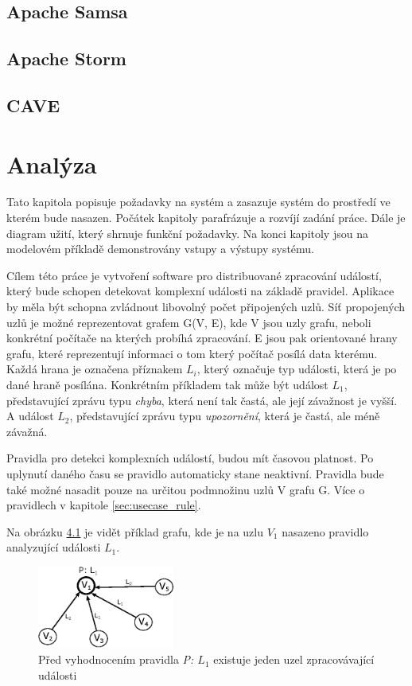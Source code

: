 \documentclass[
  digital, %
  table,   %
  nolof,     %
  nolot,     %
  oneside, %
  nocover,
  monochrome,
  12pt
]{fithesis3}
\begin{document}
\section{Apache Samsa}
\section{Apache Storm}
\section{CAVE}
\chapter{Analýza}
\label{sec:analysis}

Tato kapitola popisuje požadavky na systém a zasazuje systém do prostředí ve kterém bude nasazen. Počátek kapitoly parafrázuje a rozvíjí zadání práce. Dále je diagram užití, který shrnuje funkční požadavky. Na konci kapitoly jsou na modelovém příkladě demonstrovány vstupy a výstupy systému.

Cílem této práce je vytvoření software pro distribuované zpracování událostí, který bude schopen detekovat komplexní události na základě pravidel. Aplikace by měla být schopna zvládnout libovolný počet připojených uzlů. Síť propojených uzlů je možné reprezentovat grafem G(V, E), kde V jsou uzly grafu, neboli konkrétní počítače na kterých probíhá zpracování. E jsou pak orientované hrany grafu, které reprezentují informaci o tom který počítač posílá data kterému. Každá hrana je označena příznakem \textit{$L_i$}, který označuje typ události, která je po dané hraně posílána. Konkrétním příkladem tak může být událost \textit{$L_1$}, představující zprávu typu \textit{chyba}, která není tak častá, ale její závažnost je vyšší. A událost \textit{$L_2$}, představující zprávu typu \textit{upozornění}, která je častá, ale méně závažná.

Pravidla pro detekci komplexních událostí, budou mít časovou platnost. Po uplynutí daného času se pravidlo automaticky stane neaktivní. Pravidla bude také možné nasadit pouze na určitou podmnožinu uzlů V grafu G. Více o pravidlech v kapitole \ref{sec:usecase_rule}.

Na obrázku \ref{fig:analysis_case_1} je vidět příklad grafu, kde je na uzlu \textit{$V_1$} nasazeno pravidlo analyzující události \textit{$L_1$}.

\begin{figure}[H]
	\centering
    \includegraphics[width=0.4\textwidth, height=0.15\textheight]{images/analysis_case_1.eps}
    \caption{Před vyhodnocením pravidla \textit{P: $L_1$} existuje jeden uzel zpracovávající události}
    \label{fig:analysis_case_1}
\end{figure}
\end{document}

